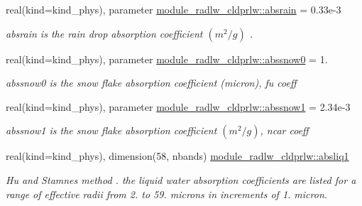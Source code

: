 \begin{DoxyCompactItemize}
\mbox{\label{namespacemodule__radlw__cldprlw_a04bff194fec27e0586ab1b4770319882}} 
real(kind=kind\+\_\+phys), parameter \hyperlink{namespacemodule__radlw__cldprlw_a04bff194fec27e0586ab1b4770319882}{module\+\_\+radlw\+\_\+cldprlw\+::absrain} = 0.\+33e-\/3
\begin{DoxyCompactList}\small\item\em absrain is the rain drop absorption coefficient $(m^{2}/g)$ . \end{DoxyCompactList}\item 
\mbox{\label{namespacemodule__radlw__cldprlw_a4bcd58c6a7e9abdfbb8f8ec7d925d143}} 
real(kind=kind\+\_\+phys), parameter \hyperlink{namespacemodule__radlw__cldprlw_a4bcd58c6a7e9abdfbb8f8ec7d925d143}{module\+\_\+radlw\+\_\+cldprlw\+::abssnow0} = 1.
\begin{DoxyCompactList}\small\item\em abssnow0 is the snow flake absorption coefficient (micron), fu coeff \end{DoxyCompactList}\item 
\mbox{\label{namespacemodule__radlw__cldprlw_a7d12b328d9dec0c525a4b0824ae7ab44}} 
real(kind=kind\+\_\+phys), parameter \hyperlink{namespacemodule__radlw__cldprlw_a7d12b328d9dec0c525a4b0824ae7ab44}{module\+\_\+radlw\+\_\+cldprlw\+::abssnow1} = 2.\+34e-\/3
\begin{DoxyCompactList}\small\item\em abssnow1 is the snow flake absorption coefficient $(m^{2}/g)$, ncar coeff \end{DoxyCompactList}\item 
\mbox{\label{namespacemodule__radlw__cldprlw_a57896538226e9184c3750440d9f62166}} 
real(kind=kind\+\_\+phys), dimension(58, nbands) \hyperlink{namespacemodule__radlw__cldprlw_a57896538226e9184c3750440d9f62166}{module\+\_\+radlw\+\_\+cldprlw\+::absliq1}
\begin{DoxyCompactList}\small\item\em Hu and Stamnes method \cite{hu_and_stamnes_1993} . the liquid water absorption coefficients are listed for a range of effective radii from 2. to 59. microns in increments of 1. micron. \end{DoxyCompactList}\item 

\end{DoxyCompactItemize}
